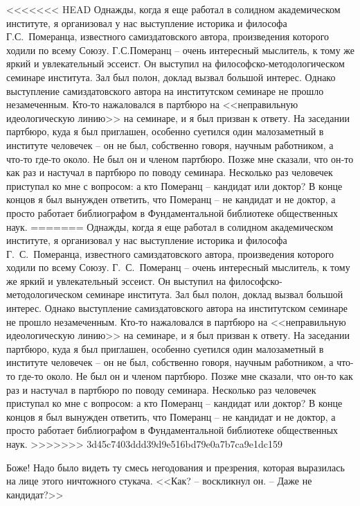 \documentclass{book}
\begin{document}
<<<<<<< HEAD
Однажды, когда я еще работал в солидном академическом институте, я организовал у нас выступление историка и философа Г.С.~Померанца, известного самиздатовского автора, произведения которого ходили по всему Союзу. Г.С.Померанц -- очень интересный мыслитель, к тому же яркий и увлекательный эссеист. Он выступил на философско‑методологическом семинаре института. Зал был полон, доклад вызвал большой интерес. Однако выступление самиздатовского автора на институтском семинаре не прошло незамеченным. Кто‑то нажаловался в партбюро на <<неправильную идеологическую линию>> на семинаре, и я был призван к ответу. На заседании партбюро, куда я был приглашен, особенно суетился один малозаметный в институте человечек -- он не был, собственно говоря, научным работником, а что‑то где‑то около. Не был он и членом партбюро. Позже мне сказали, что он‑то как раз и настучал в партбюро по поводу семинара. Несколько раз человечек приступал ко мне с вопросом: а кто Померанц -- кандидат или доктор? В конце концов я был вынужден ответить, что Померанц -- не кандидат и не доктор, а просто работает библиографом в Фундаментальной библиотеке общественных наук.
=======
Однажды, когда я еще работал в солидном академическом институте, я организовал у нас выступление историка и философа Г.~С.~Померанца, известного самиздатовского автора, произведения которого ходили по всему Союзу. Г.~С.~Померанц -- очень интересный мыслитель, к тому же яркий и увлекательный эссеист. Он выступил на философско-методологическом семинаре института. Зал был полон, доклад вызвал большой интерес. Однако выступление самиздатовского автора на институтском семинаре не прошло незамеченным. Кто-то нажаловался в партбюро на <<неправильную идеологическую линию>> на семинаре, и я был призван к ответу. На заседании партбюро, куда я был приглашен, особенно суетился один малозаметный в институте человечек -- он не был, собственно говоря, научным работником, а что-то где-то около. Не был он и членом партбюро. Позже мне сказали, что он-то как раз и настучал в партбюро по поводу семинара. Несколько раз человечек приступал ко мне с вопросом: а кто Померанц -- кандидат или доктор? В конце концов я был вынужден ответить,  что Померанц -- не кандидат и не доктор, а просто работает библиографом в Фундаментальной библиотеке общественных наук.
>>>>>>> 3d45c7403ddd39d9e516bd79e0a7b7ca9e1dc159

Боже! Надо было видеть ту смесь негодования и презрения, которая выразилась на лице этого ничтожного стукача. <<Как? -- воскликнул он. -- Даже не кандидат?>>
\end{document}
